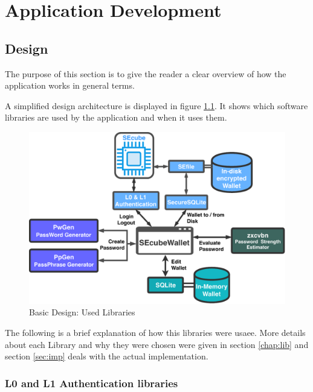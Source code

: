 \chapter{Application Development} \label{chap:dev}



\section{Design}

The purpose of this section is to give the reader a clear overview of how the application works in general terms. 

A simplified design architecture is displayed in figure \ref{fig:BasicDesign}. It shows which software libraries are used by the application and when it uses them.


\begin{figure}[ht]
	\centering
	\includegraphics[width=\textwidth]{chapters/figures/development/BasicDesign.pdf}
	\caption{Basic Design: Used Libraries}
	\label{fig:BasicDesign}
\end{figure}

The following is a brief explanation of how this libraries were usaee. More details about each Library and why they were chosen were given in section \ref{chap:lib} and section \ref{sec:imp} deals with the actual implementation.

\subsection{L0 and L1 Authentication libraries}

